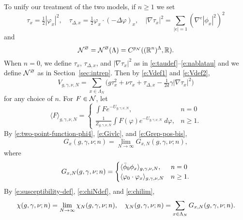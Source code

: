 To unify our treatment of the two models, if $n \ge 1$ we set
\begin{equation}
\label{e:tauphi}
\tau_x = \tfrac{1}{2} |\varphi_x|^2,
  \quad
\tau_{\Delta,x} = \tfrac{1}{2} \varphi_x \cdot (-\Delta \varphi)_x,
  \quad
|\nabla\tau_x|^2 = \sum_{|e|=1} (\nabla^e |\phi_x|^2)^2
\end{equation}
and
\begin{equation}
\label{e:Ncaldef}
\mathcal{N}^\varnothing
  = \mathcal{N}^\varnothing(\Lambda)
  = C^{p_{\mathcal{N}}}(({\mathbb R}^n)^\Lambda,{\mathbb R}).
\end{equation}
When $n = 0$, we define $\tau_x$, $\tau_{\Delta,x}$, and $|\nabla\tau_x|^2$
as in \eqref{e:taudef}--\eqref{e:nablatau}
and we define $\mathcal{N}^\varnothing$ as in Section~\ref{sec:intrep}.
Then by \eqref{e:Vdef1} and \eqref{e:Vdef2},
\begin{equation}
V_{g,\gamma,\nu,N}
  =
\sum_{x\in\Lambda_N}
\Big(
  g \tau_x^2 + \nu \tau_x + \tau_{\Delta,x} - \tfrac{1}{2 d} \gamma |\nabla\tau_x|^2
\Big)
\end{equation}
for any choice of $n$.
For $F \in \mathcal{N}$, let
\begin{equation}
\langle F \rangle_{g,\gamma,\nu,N}
  =
\begin{cases}
\displaystyle \int F e^{-U_{g,\gamma,\nu,N}},           & n = 0 \\
\displaystyle \frac{1}{Z_{g,\gamma,\nu,N}}
  \int F(\varphi) e^{-U_{g,\gamma,\nu,N}} \; d\varphi,  & n \ge 1.
\end{cases}
\end{equation}
By \eqref{e:two-point-function-phi4}, \eqref{e:Givlc}, and \eqref{e:Grep-pos-bis},
\begin{equation}
G_x(g, \gamma, \nu; n) = \lim_{N\to\infty} G_{x,N}(g, \gamma, \nu; n),
\end{equation}
where
\begin{equation}
G_{x,N}(g, \gamma, \nu; n)
  =
\begin{cases}
\langle \bar\phi_0 \phi_x \rangle_{g,\gamma,\nu,N},      & n = 0 \\
\langle \varphi_0 \cdot \varphi_x \rangle_{g,\gamma,\nu,N}  & n \ge 1.
\end{cases}
\end{equation}
By \eqref{e:susceptibility-def}, \eqref{e:chiNdef}, and \eqref{e:chilim},
\begin{equation}
\chi(g, \gamma, \nu; n)
  =
\lim_{N\rightarrow\infty} \chi_N(g, \gamma, \nu; n),
  \quad
\chi_N(g, \gamma, \nu; n)
  =
\sum_{x\in\Lambda_N} G_{x,N}(g, \gamma, \nu; n).
\end{equation}

